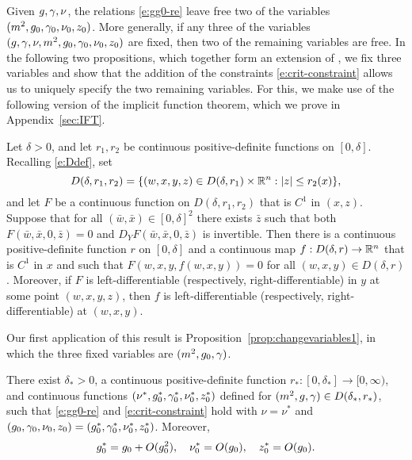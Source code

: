 Given $g,\gamma,\nu$,
the relations \eqref{e:gg0-re} leave free two of the variables
$(m^2, g_0, \gamma_0, \nu_0, z_0)$.
More generally, if any three of the variables
$(g, \gamma, \nu, m^2, g_0, \gamma_0, \nu_0, z_0)$
are fixed, then two of the remaining variables are free.
In the following two propositions, which together form an extension of
\cite[Proposition~\ref{log-prop:changevariables}]{BBS-saw4-log},
we fix three variables and show that the addition of the constraints
\eqref{e:crit-constraint}
allows us to uniquely specify the two remaining variables.
For this, we make use of the following version of the
implicit function theorem, which we prove in Appendix~\ref{sec:IFT}.

\begin{prop}
\label{prop:IFT}
Let $\delta > 0$, and let $r_1, r_2$ be continuous positive-definite functions on $[0, \delta]$.
Recalling \eqref{e:Ddef}, set
\begin{equation}
		D(\delta, r_1, r_2)
		=
		\{ (w, x, y, z) \in D(\delta, r_1) \times {\mathbb R}^n : |z| \leq r_2(x) \},
\end{equation}
and let $F$ be a continuous function on $D(\delta, r_1, r_2)$ that is $C^1$ in $(x, z)$.
Suppose that for all $(\bar w, \bar x) \in [0, \delta]^2$ there exists $\bar z$
such that both $F(\bar w, \bar x, 0, \bar z) = 0$
and $D_Y F(\bar w, \bar x, 0, \bar z)$ is invertible.
Then there is a continuous positive-definite function $r$ on $[0, \delta]$ and
a continuous map $f : D(\delta, r) \rightarrow {\mathbb R}^n$
that is $C^1$ in $x$
and such that $F(w, x, y, f(w, x, y)) = 0$
for all $(w, x, y) \in D(\delta, r)$.
Moreover, if $F$ is left-differentiable
(respectively, right-differentiable) in $y$ at some point $(w, x, y, z)$,
then $f$ is left-differentiable (respectively, right-differentiable) at $(w, x, y)$.
\end{prop}

Our first application of this result is Proposition~\ref{prop:changevariables1},
in which the three fixed variables are $(m^2, g_0, \gamma)$.

\begin{prop}
\label{prop:changevariables1}
There exist $\delta_* > 0$,
a continuous positive-definite function $r_* : [0, \delta_*] \to [0, \infty)$,
and continuous functions $(\nu^*, g_0^*, \gamma_0^*, \nu_0^*, z_0^*)$
defined for $(m^2, g, \gamma) \in D(\delta_*, r_*)$, such that
\eqref{e:gg0-re} and \eqref{e:crit-constraint} hold with $\nu = \nu^*$ and
$(g_0, \gamma_0, \nu_0, z_0) = (g^*_0, \gamma^*_0, \nu^*_0, z^*_0)$.
Moreover,
\begin{gather}
\label{e:gznustarbd}
g_0^* = g_0 + O(g_0^2),
\quad
\nu_0^* = O(g_0),
\quad
z_0^* = O(g_0).
\end{gather}
\end{prop}

